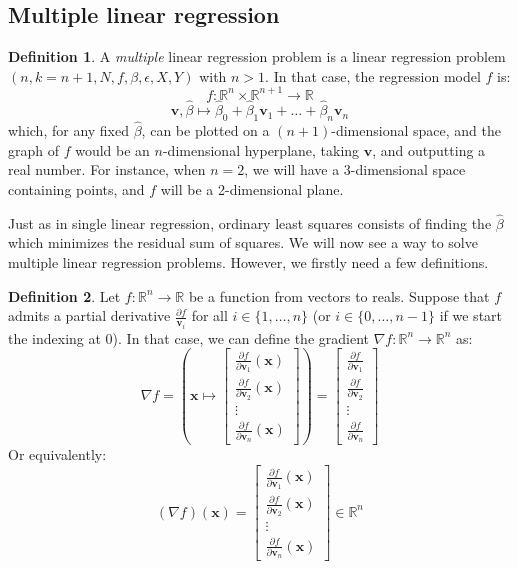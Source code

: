 \documentclass{article}
\theoremstyle{definition}
\newtheorem{definition}{Definition}[section]
\theoremstyle{remark}
\newtheorem*{remark}{Remark}
\theoremstyle{example}
\newcommand{\vv}{\mathbf{v}}
\newcommand{\betat}{\hat{\beta}}
\newcommand{\x}{\mathbf{x}}
\begin{document}

\subsection{Multiple linear regression}

\begin{definition}
		A \textit{multiple} linear regression problem is a linear regression problem $(n, k=n+1, N, f, \beta, \epsilon, X, Y)$ with $n>1$. In that case, the regression model $f$ is:
				$$f : \mathbb{R}^n \times \mathbb{R}^{n+1} \rightarrow \mathbb{R}$$
				$$\vv, \betat \mapsto \betat_0 + \betat_1 \vv_1 + \dots + \betat_n \vv_n$$ 
		which, for any fixed $\betat$, can be plotted on a $(n+1)$-dimensional space, and the graph of $f$ would be an $n$-dimensional hyperplane, taking $\vv$, and outputting a real number. For instance, when $n=2$, we will have a 3-dimensional space containing points, and $f$ will be a 2-dimensional plane.
\end{definition}

Just as in single linear regression, ordinary least squares consists of finding the $\betat$ which minimizes the residual sum of squares. We will now see a way to solve multiple linear regression problems. However, we firstly need a few definitions.

\begin{definition}
		Let $f : \mathbb{R}^n \rightarrow \mathbb{R}$ be a function from vectors to reals. Suppose that $f$ admits a partial derivative $\frac{\partial f}{\vv_i}$ for all $i \in \{1, \dots, n\}$ (or $i \in \{0, \dots, n-1\}$ if we start the indexing at 0). In that case, we can define the gradient $\nabla f : \mathbb{R}^n \rightarrow \mathbb{R}^n$ as:
		$$\nabla f = \left(\x \mapsto \begin{bmatrix} \frac{\partial f}{\partial \vv_1}(\x) \\ \frac{\partial f}{\partial \vv_2}(\x) \\ \vdots \\ \frac{\partial f}{\partial \vv_n}(\x) \end{bmatrix}\right) = \begin{bmatrix} \frac{\partial f}{\partial \vv_1} \\ \frac{\partial f}{\partial \vv_2} \\ \vdots \\ \frac{\partial f}{\partial \vv_n} \end{bmatrix}$$
		Or equivalently:
				$$(\nabla f)(\x) = \begin{bmatrix} \frac{\partial f}{\partial \vv_1}(\x) \\ \frac{\partial f}{\partial \vv_2}(\x) \\ \vdots \\ \frac{\partial f}{\partial \vv_n}(\x) \end{bmatrix} \in \mathbb{R}^n$$
\end{definition}
\end{document}
